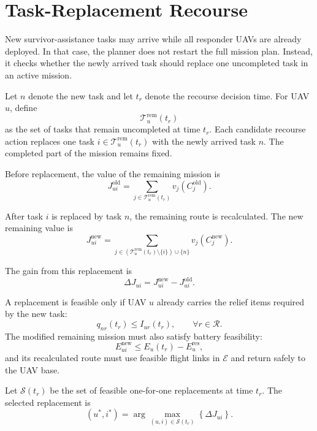 \section{Task-Replacement Recourse}

New survivor-assistance tasks may arrive while all responder UAVs are already
deployed. In that case, the planner does not restart the full mission plan.
Instead, it checks whether the newly arrived task should replace one
uncompleted task in an active mission.

Let $n$ denote the new task and let $t_r$ denote the recourse decision time.
For UAV $u$, define
\[
\mathcal{T}_u^{\mathrm{rem}}(t_r)
\]
as the set of tasks that remain uncompleted at time $t_r$. Each candidate
recourse action replaces one task
$i\in\mathcal{T}_u^{\mathrm{rem}}(t_r)$ with the newly arrived task $n$. The
completed part of the mission remains fixed.

Before replacement, the value of the remaining mission is
\begin{equation}
J_{ui}^{\mathrm{old}}
=
\sum_{j\in\mathcal{T}_u^{\mathrm{rem}}(t_r)}
v_j(C_j^{\mathrm{old}}).
\end{equation}

After task $i$ is replaced by task $n$, the remaining route is recalculated.
The new remaining value is
\begin{equation}
J_{ui}^{\mathrm{new}}
=
\sum_{j\in(\mathcal{T}_u^{\mathrm{rem}}(t_r)\setminus\{i\})\cup\{n\}}
v_j(C_j^{\mathrm{new}}).
\end{equation}

The gain from this replacement is
\begin{equation}
\Delta J_{ui}
=
J_{ui}^{\mathrm{new}}
-
J_{ui}^{\mathrm{old}}.
\end{equation}

A replacement is feasible only if UAV $u$ already carries the relief items
required by the new task:
\begin{equation}
q_{nr}(t_r)
\leq
I_{ur}(t_r),
\qquad
\forall r\in\mathcal{R}.
\end{equation}
The modified remaining mission must also satisfy battery feasibility:
\begin{equation}
E_{ui}^{\mathrm{new}}
\leq
E_u(t_r)-E_u^{\mathrm{res}},
\end{equation}
and its recalculated route must use feasible flight links in $\mathcal{E}$ and
return safely to the UAV base.

Let $\mathcal{S}(t_r)$ be the set of feasible one-for-one replacements at
time $t_r$. The selected replacement is
\begin{equation}
(u^*,i^*)
=
\arg\max_{(u,i)\in\mathcal{S}(t_r)}
\left\{
\Delta J_{ui}
\right\}.
\end{equation}

